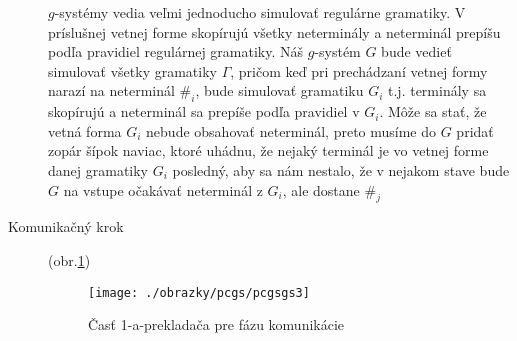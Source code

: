 \begin{dokaz}
\begin{description}
  $g$-systémy vedia veľmi jednoducho simulovať regulárne
  gramatiky. V príslušnej vetnej forme skopírujú všetky
  neterminály a neterminál prepíšu podľa pravidiel regulárnej
  gramatiky. Náš $g$-systém $G$ bude vedieť simulovať všetky gramatiky
  $\Gamma$, pričom keď pri prechádzaní vetnej formy narazí na
  neterminál $\#_i$, bude simulovať gramatiku $G_i$ t.j. terminály
  sa skopírujú a neterminál sa prepíše podľa pravidiel v $G_i$.
  Môže sa stať, že vetná forma $G_i$ nebude obsahovať neterminál,
  preto musíme do $G$ pridať zopár šípok naviac, ktoré uhádnu, že
  nejaký terminál je vo vetnej forme danej gramatiky $G_i$
  posledný, aby sa nám nestalo, že v nejakom stave bude $G$
  na vstupe očakávať neterminál z $G_i$, ale dostane $\#_j$

  \item[Komunikačný krok] (obr.\ref{pcgsgs3})
\begin{figure}[ht]
  \centering
  \texttt{[image: ./obrazky/pcgs/pcgsgs3]}
  \caption{Časť 1-a-prekladača pre fázu komunikácie}\label{pcgsgs3}
\end{figure}


\end{description}
\end{dokaz}
